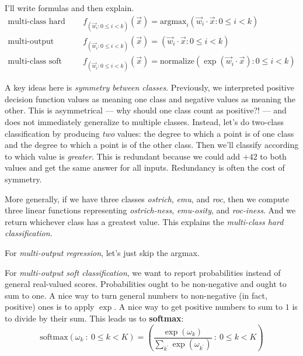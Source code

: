 \documentclass[11pt, justified]{tufte-book}
\theoremstyle{definition}
\begin{document}
        I'll write formulas and then explain.
        \begin{align*}
            \text{multi-class hard classification}\quad&
            f_{(\vec w_i : 0\leq i < k)}(\vec x) = \text{argmax}_i(\vec w_i\cdot \vec x : 0\leq i<k) 
        \\
            \text{multi-output regression}\quad&
            f_{(\vec w_i  : 0\leq i < k)}(\vec x) = (\vec w_i \cdot \vec x : 0\leq i < k)
        \\
            \text{multi-class soft classification}\quad&
            f_{(\vec w_i  : 0\leq i < k)}(\vec x) = \text{normalize}(\exp(\vec w_i \cdot \vec x) : 0\leq i < k)
        \end{align*}

        A key ideas here is \emph{symmetry between classes}.  Previously, we
        interpreted positive decision function values as meaning one class and
        negative values as meaning the other.  This is asymmetrical --- why
        should one class count as positive?! --- and does not immediately
        generalize to multiple classes.
        Instead, let's do two-class classification by producing \emph{two}
        values: the degree to which a point is of one class
            and the degree to which a point is of the other class.
        Then we'll classify according to which value is \emph{greater}. 
        This is redundant because we could add $+42$ to both values and get the
        same answer for all inputs.  Redundancy is often the cost of symmetry.

        More generally, if we have three classes \emph{ostrich}, \emph{emu},
        and \emph{roc}, then we compute three linear functions representing
        \emph{ostrich-ness}, \emph{emu-osity}, and \emph{roc-iness}.  And we
        return whichever class has a greatest value.  This explains the
        \emph{multi-class hard classification}.

        For \emph{multi-output regression}, let's just skip the argmax.

        For \emph{multi-output soft classification}, we want to report
        probabilities instead of general real-valued scores.  Probabilities
        ought to be non-negative and ought to sum to one.  A nice way to turn
        general numbers to non-negative (in fact, positive) ones is to apply
        $\exp$.  A nice way to get positive numbers to sum to $1$ is to divide
        by their sum.  This leads us to \textbf{softmax}:
        $$
          \text{softmax}(\omega_k ~:~ 0\leq k<K) = \left(\frac{\exp(\omega_k)}{\sum_{k^\prime} \exp(\omega_{k^\prime})} ~:~ 0\leq k<K\right)
        $$
\end{document}
